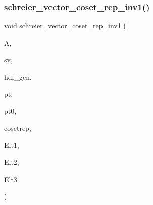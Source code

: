 \mbox{\label{schreier__vector_8_c_aaffd6f92b6fe477ab9111720c03d7f34}} 
\subsubsection{\texorpdfstring{schreier\+\_\+vector\+\_\+coset\+\_\+rep\+\_\+inv1()}{schreier\_vector\_coset\_rep\_inv1()}}
{\footnotesize\ttfamily void schreier\+\_\+vector\+\_\+coset\+\_\+rep\+\_\+inv1 (\begin{DoxyParamCaption}\item[{\mbox{\hyperlink{classaction}{action}} $\ast$}]{A,  }\item[{\mbox{\hyperlink{galois_8h_a09fddde158a3a20bd2dcadb609de11dc}{I\+NT}} $\ast$}]{sv,  }\item[{\mbox{\hyperlink{galois_8h_a09fddde158a3a20bd2dcadb609de11dc}{I\+NT}} $\ast$}]{hdl\+\_\+gen,  }\item[{\mbox{\hyperlink{galois_8h_a09fddde158a3a20bd2dcadb609de11dc}{I\+NT}}}]{pt,  }\item[{\mbox{\hyperlink{galois_8h_a09fddde158a3a20bd2dcadb609de11dc}{I\+NT}} \&}]{pt0,  }\item[{\mbox{\hyperlink{galois_8h_a09fddde158a3a20bd2dcadb609de11dc}{I\+NT}} $\ast$}]{cosetrep,  }\item[{\mbox{\hyperlink{galois_8h_a09fddde158a3a20bd2dcadb609de11dc}{I\+NT}} $\ast$}]{Elt1,  }\item[{\mbox{\hyperlink{galois_8h_a09fddde158a3a20bd2dcadb609de11dc}{I\+NT}} $\ast$}]{Elt2,  }\item[{\mbox{\hyperlink{galois_8h_a09fddde158a3a20bd2dcadb609de11dc}{I\+NT}} $\ast$}]{Elt3 }\end{DoxyParamCaption})}

\mbox{\label{schreier__vector_8_c_a883d183be771dd98e040dbe1b7ed0d3c}} 
